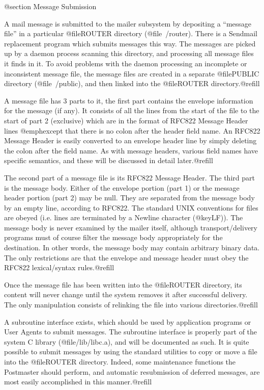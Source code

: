 @section Message Submission

A mail message is submitted to the mailer subsystem by depositing a ``message
file'' in a particular @file{ROUTER} directory (@file{~/router}).  There is
a Sendmail replacement program which submits messages this way.  The messages
are picked up by a daemon process scanning this directory, and processing all
message files it finds in it. To avoid problems with the daemon processing
an incomplete or inconsistent message file, the message files are created in
a separate @file{PUBLIC} directory (@file{~/public}), and then linked into the
@file{ROUTER} directory.@refill

A message file has 3 parts to it, the first part contains the envelope
information for the message (if any). It consists of all the lines from the
start of the file to the start of part 2 (exclusive) which are in the format
of RFC822 Message Header lines @emph{except} that there is no colon after the
header field name. An RFC822 Message Header is easily converted to
an envelope header line by simply deleting the colon after the field
name. As with message headers, various field names have specific semantics,
and these will be discussed in detail later.@refill

The second part of a message file is its RFC822 Message Header. The third
part is the message body. Either of the envelope portion (part 1) or the
message header portion (part 2) may be null. They are separated from the
message body by an empty line, according to RFC822. The standard UNIX
conventions for files are obeyed (i.e. lines are terminated by a Newline
character (@key{LF})). The message body is never examined by the mailer itself,
although transport/delivery programs must of course filter the message body
appropriately for the destination. In other words, the message body may
contain arbitrary binary data. The only restrictions are that the envelope
and message header must obey the RFC822 lexical/syntax rules.@refill

Once the message file has been written into the @file{ROUTER} directory,
its content will never change until the system removes it after successful
delivery. The only manipulation consists of relinking the file into various
directories.@refill

A subroutine interface exists, which should be used by application
programs or User Agents to submit messages. The subroutine interface is
properly part of the system C library (@file{/lib/libc.a}), and will be
documented as such. It is quite possible to submit messages by using
the standard utilities to copy or move a file into the @file{ROUTER}
directory. Indeed, some maintenance functions the Postmaster should
perform, and automatic resubmission of deferred messages, are most
easily accomplished in this manner.@refill

